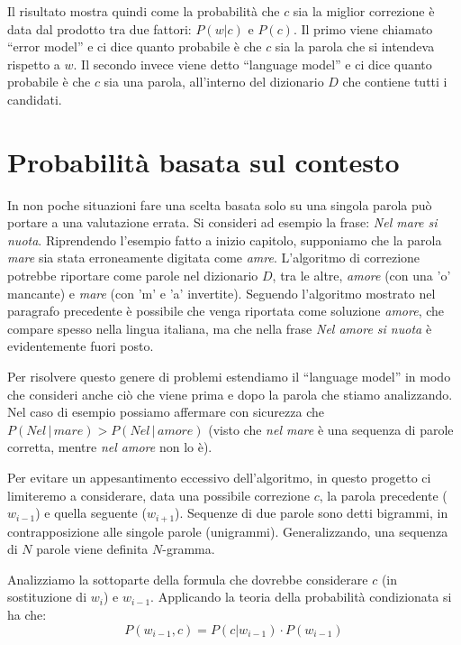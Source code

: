 Il risultato mostra quindi come la probabilità che $c$ sia la miglior correzione è data dal prodotto tra due fattori: $P(w|c)$ e $P(c)$. 
Il primo viene chiamato ``error model'' e ci dice quanto probabile è che $c$ sia la parola che si intendeva rispetto a $w$.
Il secondo invece viene detto ``language model'' e ci dice quanto probabile è che $c$ sia una parola, all'interno del dizionario $D$ che contiene tutti i candidati.

\section{Probabilità basata sul contesto}
\label{probabilita}

In non poche situazioni fare una scelta basata solo su una singola parola può portare a una valutazione errata. Si consideri ad esempio la frase: \emph{Nel mare si nuota}. Riprendendo l'esempio fatto a inizio capitolo, supponiamo che la parola \emph{mare} sia stata erroneamente digitata come \emph{amre}. L'algoritmo di correzione potrebbe riportare come parole nel dizionario $D$, tra le altre, \emph{amore} (con una 'o' mancante) e \emph{mare} (con 'm' e 'a' invertite). Seguendo l'algoritmo mostrato nel paragrafo precedente è possibile che venga riportata come soluzione \emph{amore}, che compare spesso nella lingua italiana, ma che nella frase \emph{Nel amore si nuota} è evidentemente fuori posto.

Per risolvere questo genere di problemi estendiamo il ``language model'' in modo che consideri anche ciò che viene prima e dopo la parola che stiamo analizzando. Nel caso di esempio possiamo affermare con sicurezza che $P(Nel\,|\, mare) > P(Nel\,|\,amore)$ (visto che \emph{nel mare} è una sequenza di parole corretta, mentre \emph{nel amore} non lo è).

Per evitare un appesantimento eccessivo dell'algoritmo, in questo progetto ci limiteremo a considerare, data una possibile correzione $c$, la parola precedente ($w_{i-1}$) e quella seguente ($w_{i+1}$).
Sequenze di due parole sono detti bigrammi, in contrapposizione alle singole parole (unigrammi). Generalizzando, una sequenza di $N$ parole viene definita $N$-gramma.

Analizziamo la sottoparte della formula che dovrebbe considerare $c$ (in sostituzione di $w_{i}$) e $w_{i-1}$. Applicando la teoria della probabilità condizionata si ha che:
\begin{equation}
P(w_{i-1}, c) = P(c | w_{i-1}) \cdot P(w_{i-1})
\end{equation}

